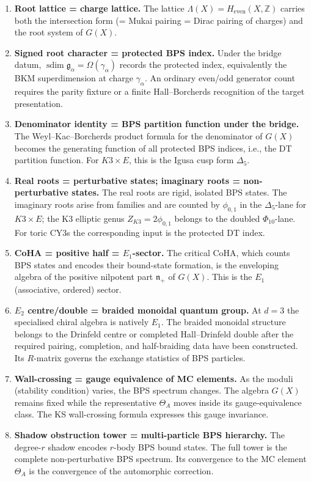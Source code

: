 \documentclass[11pt]{article}
\theoremstyle{definition}
\newcommand{\sdim}{\operatorname{sdim}}
\newcommand{\bZ}{\mathbb{Z}}
\begin{document}
\begin{enumerate}
 \item \textbf{Root lattice = charge lattice.} The lattice
 $\Lambda(X) = H_{\mathrm{even}}(X, \bZ)$ carries both the
 intersection form (= Mukai pairing = Dirac pairing of charges)
 and the root system of $G(X)$.

 \item \textbf{Signed root character = protected BPS index.} Under
 the bridge datum, \(\sdim\mathfrak g_\alpha = \Omega(\gamma_\alpha)\) records the
 protected index, equivalently the BKM superdimension at charge
 $\gamma_\alpha$. An ordinary even/odd generator count requires the
 parity fixture or a finite Hall--Borcherds recognition of the target
 presentation.

 \item \textbf{Denominator identity = BPS partition function under the bridge.} The
 Weyl--Kac--Borcherds product formula for the denominator of
 $G(X)$ becomes the generating function of all protected BPS indices, i.e.,
 the DT partition function. For $K3 \times E$, this is the Igusa
 cusp form $\Delta_5$.

 \item \textbf{Real roots = perturbative states; imaginary roots =
 non-perturbative states.} The real roots are rigid, isolated BPS
 states. The imaginary roots arise from families and are counted by
 \(\phi_{0,1}\) in the \(\Delta_5\)-lane for \(K3\times E\); the K3
 elliptic genus \(Z_{K3}=2\phi_{0,1}\) belongs to the doubled
 \(\Phi_{10}\)-lane. For toric CY3s the corresponding input is the
 protected DT index.

 \item \textbf{CoHA = positive half = $E_1$-sector.} The critical
 CoHA, which counts BPS states and encodes their bound-state
 formation, is the enveloping algebra of the positive nilpotent
 part $\mathfrak{n}_+$ of $G(X)$. This is the $E_1$
 (associative, ordered) sector.

 \item \textbf{$E_2$ centre/double = braided monoidal quantum group.}
 At $d=3$ the specialised chiral algebra is natively $E_1$. The
 braided monoidal structure belongs to the Drinfeld centre or completed
 Hall--Drinfeld double after the required pairing, completion, and
 half-braiding data have been constructed. Its $R$-matrix governs the
 exchange statistics of BPS particles.

 \item \textbf{Wall-crossing = gauge equivalence of MC elements.}
 As the moduli (stability condition) varies, the BPS spectrum
 changes. The algebra $G(X)$ remains fixed while the representative
 $\Theta_A$ moves inside its gauge-equivalence class. The KS
 wall-crossing formula expresses this gauge invariance.

 \item \textbf{Shadow obstruction tower = multi-particle BPS hierarchy.} The
 degree-$r$ shadow encodes $r$-body BPS bound states. The full
 tower is the complete non-perturbative BPS spectrum. Its
 convergence to the MC element $\Theta_A$ is the convergence of
 the automorphic correction.
\end{enumerate}
\end{document}
